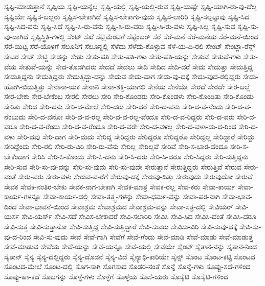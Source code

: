 {ಸೃಷ್ಟಿ-ಮಾಡುತ್ತಾನೆ
ಸೃಷ್ಟಿಯ
ಸೃಷ್ಟಿ-ಯನ್ನೆಲ್ಲ
ಸೃಷ್ಟಿ-ಯಲ್ಲಿ
ಸೃಷ್ಟಿ-ಯಲ್ಲಿ-ರುವ
ಸೃಷ್ಟಿ-ಯಷ್ಟೇ
ಸೃಷ್ಟಿ-ಯಾಗಿ-ರು-ವು-ದೆಲ್ಲ
ಸೃಷ್ಟಿಯೇ
ಸೃಷ್ಟಿಸ-ಬಲ್ಲರು
ಸೃಷ್ಟಿಸ-ಬೇಕಾಗಿದೆ
ಸೃಷ್ಟಿಸ-ಬೇಕಾಗು-ವುದು
ಸೃಷ್ಟಿಸ-ಲಾರಿರಿ
ಸೃಷ್ಟಿ-ಸಲ್ಪಟ್ಟುವು
ಸೃಷ್ಟಿ-ಸಿದ
ಸೃಷ್ಟಿ-ಸಿದ-ವನು
ಸೃಷ್ಟಿ-ಸಿದೆ
ಸೃಷ್ಟಿ-ಸಿ-ರು-ವನು
ಸೃಷ್ಟಿ-ಸಿ-ರು-ವರು
ಸೃಷ್ಟಿ-ಸಿ-ರು-ವಳು
ಸೃಷ್ಟಿ-ಸಿಲ್ಲ
ಸೃಷ್ಟಿ-ಸುವ
ಸೃಷ್ಟಿ-ಸು-ವು-ದಾಗಿದೆ
ಸೃಷ್ಟಿಸ್ಥಿತಿ-ಗಳಲ್ಲಿ
ಸೆಂಟ್
ಸೆಖೆ
ಸೆಟ್ಲಿಮೆಂಟಿಗೆ
ಸೆಪ್ಟೆಂಬರ್
ಸೆರೆ
ಸೆರೆ-ಮನೆ
ಸೆರೆ-ಮನೆಯ
ಸೆರೆ-ಮನೆ-ಯಿಂದ
ಸೆರೆ-ಯಿಟ್ಟ
ಸೆರೆ-ಯೊಳಗೆ
ಸೆಲೂನಿಗೆ
ಸೆಲೂನ್ನಲ್ಲಿ
ಸೆಳೆದು
ಸೆಳೆದು-ಕೊಳ್ಳುವ
ಸೆಳೆ-ಯ-ದಿ-ರಲಿ
ಸೇಂಟ್
ಸೇಂಟ್ಲಾ-ರೆನ್ಸ್
ಸೇಟರ
ಸೇಟ್
ಸೇಟ್ಜಿ
ಸೇಡನ್ನು
ಸೇಡು
ಸೇತು-ಪತಿ
ಸೇತು-ಪತಿ-ಗಳು
ಸೇತು-ಪತಿ-ಯನ್ನು
ಸೇತುವೆ
ಸೇತುವೆ-ಗಳು
ಸೇತು-ವೆಯ
ಸೇತುವೆ-ಯನ್ನು
ಸೇದ-ತೊಡಗಿದರು
ಸೇದದೆ
ಸೇದಲು
ಸೇದಿ
ಸೇದಿದ
ಸೇದಿ-ದರೆ
ಸೇದು
ಸೇದುತ್ತಾ
ಸೇದುತ್ತಿದ್ದ
ಸೇದುತ್ತಿದ್ದನು
ಸೇದುತ್ತಿದ್ದರು
ಸೇದುತ್ತಿದ್ದು-ದನ್ನು
ಸೇದುವ
ಸೇದು-ವಾಗ
ಸೇದು-ವು-ದಕ್ಕೆ
ಸೇದು-ವುದ-ರಲ್ಲಿದ್ದರು
ಸೇದು-ಹೋಗಿ-ಬಿಡುತ್ತಿತ್ತು
ಸೇನಾನಾ-ಯಕ
ಸೇನಾನಿ
ಸೇನಾ-ಶಕ್ತಿ-ಯಾಗಲಿ
ಸೇನೆಯ
ಸೇನೆಯೇ
ಸೇರದೆ
ಸೇರದೇ
ಸೇರ-ಬಲ್ಲೆ
ಸೇರ-ಬೇಕು
ಸೇರ-ಬೇಕೆಂಬ
ಸೇರಲಿ
ಸೇರಲು
ಸೇರಿ
ಸೇರಿ-ಕೊಂಡರು
ಸೇರಿ-ಕೊಂಡಳು
ಸೇರಿ-ಕೊಂಡಿತು
ಸೇರಿ-ಕೊಂಡು
ಸೇರಿತು
ಸೇರಿದ
ಸೇರಿ-ದನು
ಸೇರಿ-ದ-ಮೇಲೆ
ಸೇರಿ-ದರು
ಸೇರಿ-ದರೆ
ಸೇರಿ-ದ-ವನು
ಸೇರಿ-ದ-ವ-ನೆಂದು
ಸೇರಿ-ದ-ವ-ನೆಂಬುದು
ಸೇರಿ-ದ-ವನೋ
ಸೇರಿ-ದ-ವ-ರಲ್ಲ
ಸೇರಿ-ದ-ವ-ರಲ್ಲ-ವೆಂದೂ
ಸೇರಿ-ದ-ವ-ರಿದ್ದರು
ಸೇರಿ-ದ-ವರು
ಸೇರಿ-ದ-ವರೂ
ಸೇರಿ-ದ-ವ-ರೆಂದು
ಸೇರಿ-ದ-ವ-ರೆಂದೂ
ಸೇರಿ-ದ-ವರೇ
ಸೇರಿ-ದ-ವಳಲ್ಲ
ಸೇರಿ-ದ-ವಳಾ-ದು-ದ-ರಿಂದ
ಸೇರಿ-ದ-ವಳು
ಸೇರಿ-ದವು
ಸೇರಿ-ದಾಗ
ಸೇರಿ-ದುದು
ಸೇರಿದ್ದ
ಸೇರಿದ್ದರು
ಸೇರಿದ್ದರೂ
ಸೇರಿದ್ದರೊ
ಸೇರಿದ್ದಲ್ಲ
ಸೇರಿದ್ದಾರೆ
ಸೇರಿದ್ದು
ಸೇರಿದ್ದೆಂದು
ಸೇರಿ-ರಲಿ
ಸೇರಿ-ರು-ವಿರಿ
ಸೇರಿ-ರು-ವೆನು
ಸೇರಿಲ್ಲ
ಸೇರಿಲ್ಲವೆ
ಸೇರಿವೆ
ಸೇರಿ-ಸ-ಬಾರ-ದೆಂದೂ
ಸೇರಿ-ಸ-ಬೇಕೆಂದಾಗ
ಸೇರಿಸಿ
ಸೇರಿ-ಸಿ-ಕೊಂಡು
ಸೇರಿ-ಸಿ-ದನು
ಸೇರಿ-ಸಿ-ದರು
ಸೇರಿ-ಸಿ-ದರೂ
ಸೇರಿ-ಸಿದ್ದರು
ಸೇರಿ-ಸುತ್ತಿದ್ದನು
ಸೇರಿ-ಸುವ
ಸೇರಿ-ಸು-ವು-ದನ್ನು
ಸೇರಿ-ಸು-ವುದು
ಸೇರಿ-ಸು-ವುದೇ
ಸೇರುತ್ತಾನೆ
ಸೇರುತ್ತಿದ್ದರು
ಸೇರುತ್ತಿವೆ
ಸೇರುವ
ಸೇರು-ವಂತೆ
ಸೇರು-ವರು
ಸೇರು-ವಳು
ಸೇರುವ-ವ-ರೆಗೆ
ಸೇರುವು-ದಕ್ಕೆ
ಸೇರುವು-ದಿತ್ತು
ಸೇರುವುದು
ಸೇರುವುದೋ
ಸೇರುವೆ
ಸೇವಕ
ಸೇವಕ-ನಂತಿರ-ಬೇಕು
ಸೇವಕ-ನಾಗ-ಬೇಕಾಗಿ
ಸೇವಕ-ಮಾತ್ರ
ಸೇವಕ-ರಲ್ಲ
ಸೇವ-ಕರು
ಸೇವಾ-ಕಾರ್ಯ
ಸೇವಾ-ಕಾರ್ಯ-ಗಳನ್ನೂ
ಸೇವಾ-ಕಾರ್ಯ-ದಲ್ಲಿ
ಸೇವಾ-ತತ್ತ್ವ-ಗಳನ್ನು
ಸೇವಾ-ಧರ್ಮ-ವನ್ನು
ಸೇವಾ-ಪರ-ನಾಗಿ
ಸೇವಾ-ಭಾವ-ದಿಂದ
ಸೇವಾ-ಭಾವನೆ-ಯಿಂದ
ಸೇವಾಶ್ರಮ
ಸೇವಾಶ್ರಮದ
ಸೇವಾಶ್ರಮ-ವನ್ನು
ಸೇವಾ-ಸತ್ರ-ದಲ್ಲಿ
ಸೇವಿಯರ್
ಸೇವಿ-ಯರ್ಸ
ಸೇವಿ-ಯರ್ಸ್
ಸೇವಿ-ಸದೆ
ಸೇವಿಸ-ಬೇಕಾದರೆ
ಸೇವಿ-ಸಲಾರಿರಿ
ಸೇವಿಸಿ
ಸೇವಿ-ಸಿದ
ಸೇವಿಸಿ-ದಂತೆ
ಸೇವಿಸಿ-ದರೂ
ಸೇವಿ-ಸುತ್ತ
ಸೇವಿ-ಸುತ್ತಾನೋ
ಸೇವಿ-ಸುತ್ತಿದ್ದ
ಸೇವಿ-ಸುತ್ತಿದ್ದಾರೆ
ಸೇವಿ-ಸುವರು
ಸೇವಿಸು-ವಿರಿ
ಸೇವಿ-ಸುವು-ದಕ್ಕೆ
ಸೇವಿ-ಸು-ವು-ದ-ರಿಂದ
ಸೇವಿ-ಸು-ವುದು
ಸೇವೆ
ಸೇವೆ-ಗಾಗಿ
ಸೇವೆಗೆ
ಸೇವೆ-ಗೆಂದು
ಸೇವೆ-ಮಾಡಿ
ಸೇವೆ-ಮಾಡು
ಸೇವೆ-ಮಾಡುತ್ತ
ಸೇವೆ-ಮಾಡುವ
ಸೇವೆಯ
ಸೇವೆ-ಯನ್ನು
ಸೇವೆ-ಯನ್ನೂ
ಸೇವೆ-ಯಲ್ಲಿ
ಸೇವೆಯೇ
ಸೈಂಟ್
ಸೈತಾನ-ನನ್ನು
ಸೈತಾನ-ನಿಂದ
ಸೈತಾನ್
ಸೈನ್ಯ
ಸೈನ್ಯ-ದಲ್ಲಿದ್ದರು
ಸೈನ್ಯ-ದೊಡನೆ
ಸೈನ್ಯ-ವಿದೆ
ಸೈನ್ಯಾಧಿ-ಕಾರಿಯೇ
ಸೈನ್ಸ್
ಸೊಂಟ
ಸೊಂಟ-ಕಟ್ಟಿ
ಸೊಂಟದ
ಸೊಂಟದ-ಮೇಲೆ
ಸೊಂಟ-ದಲ್ಲಿ
ಸೊಗ-ಸಾಗಿ
ಸೊಗಸಾದ
ಸೊಡರಿ-ನಂತೆ
ಸೊನ್ನೆ
ಸೊನ್ನೆ-ಗಳು
ಸೊಪ್ಪು-ಸದೆ-ಗಳಿಂದ
ಸೊಪ್ಪು-ಹಾ-ಕದೆ
ಸೊಬಗನ್ನು
ಸೊಳ್ಳೆ-ಗಳು
ಸೊಳ್ಳೆಗೆ
ಸೊಳ್ಳೆಯ
ಸೊಸೆ-ಯರು
ಸೊಸೈಟಿ
ಸೊಸೈಟಿ-ಗಳಿಂದ
}
